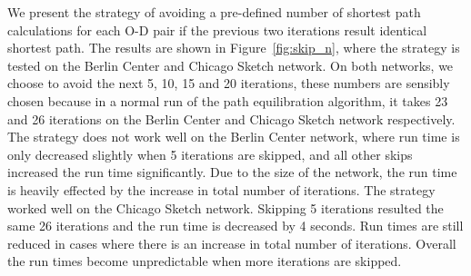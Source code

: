 We present the strategy of avoiding a pre-defined number of shortest path calculations for each O-D pair if the previous two iterations result identical shortest path.
The results are shown in Figure~\ref{fig:skip_n},
where the strategy is tested on the Berlin Center and Chicago Sketch network.
On both networks,
we choose to avoid the next 5, 10, 15 and 20 iterations,
these numbers are sensibly chosen because in a normal run of the path equilibration algorithm, it takes 23 and 26 iterations on the Berlin Center and Chicago Sketch network respectively.
The strategy does not work well on the Berlin Center network,
where run time is only decreased slightly when 5 iterations are skipped,
and all other skips increased the run time significantly.
Due to the size of the network,
the run time is heavily effected by the increase in total number of iterations.
The strategy worked well on the Chicago Sketch network.
Skipping 5 iterations resulted the same 26 iterations and the run time is decreased by 4 seconds.
Run times are still reduced in cases where there is an increase in total number of iterations.
Overall the run times become unpredictable when more iterations are skipped.


